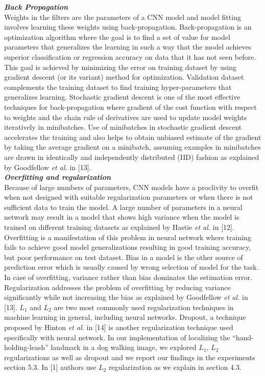 \documentclass [11pt,letterpaper ,twoside ,openany ]{report}
\begin{document}
    \noindent
    \textbf{\textit{Back Propagation}}\\
    Weights in the filters are the parameters of a CNN model and model fitting involves learning these weights using back-propagation. Back-propagation is an optimization algorithm where the goal is to find a set of value for model parameters that generalizes the learning in such a way that the model achieves superior classification or regression accuracy on data that it has not seen before. This goal is achieved by minimizing the error on training dataset by using gradient descent (or its variant) method for optimization. Validation dataset complements the training dataset to find training hyper-parameters that generalizes learning. Stochastic gradient descent is one of the most effective techniques for back-propagation where gradient of the cost function with respect to weights and the chain rule of derivatives are used to update model weights iteratively in minibatches. Use of minibatches in stochastic gradient descent accelerates the training and also helps to obtain unbiased estimate of the gradient by taking the average gradient on a minibatch, assuming examples in minibatches are drawn in identically and independently distributed (IID) fashion as explained by Goodfellow \textit {et al.} in [13].\\

    \noindent
    \textbf{\textit{Overfitting and regularization}}\\
    Because of large numbers of parameters, CNN models have a proclivity to overfit when not designed with suitable regularization parameters or when there is not sufficient data to train the model. A large number of parameters in a neural network may result in a model that shows high variance when the model is trained on different training datasets as explained by Hastie \textit {et al.} in [12]. Overfitting is a manifestation of this problem in neural network where training fails to achieve good model generalizations resulting in good training accuracy, but poor performance on test dataset. Bias in a model is the other source of prediction error which is usually caused by wrong selection of model for the task. In case of overfitting, variance rather than bias dominates the estimation error. Regularization addresses the problem of overfitting by reducing variance significantly while not increasing the bias as explained by Goodfellow \textit {et al.} in [13]. \(L_1\) and \(L_2\) are two most commonly used regularization techniques in machine learning in general, including neural networks. Dropout, a technique proposed by Hinton \textit {et al.} in [14] is another regularization technique used specifically with neural network. In our implementation of localizing the ``hand-holding-leash'' landmark in a dog walking image, we explored \(L_1\), \(L_2\) regularizations as well as dropout and we report our findings in the experiments section 5.3. In [1] authors use \(L_2\) regularization as we explain in section 4.3.
\end{document}
